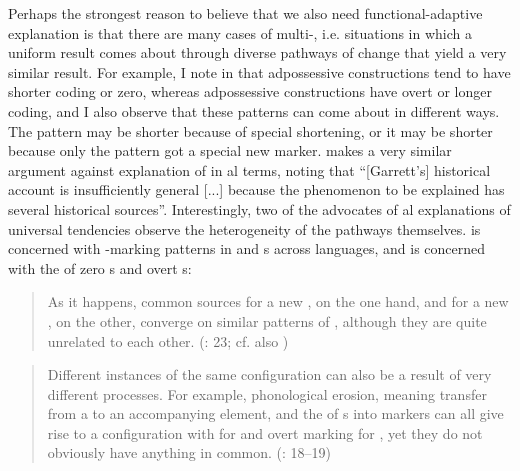 \documentclass[output=paper]{langsci/langscibook}
\begin{document}
Perhaps the strongest reason to believe that we also need functional-adaptive explanation is that there are many cases of multi-, i.e. situations in which a uniform result comes about through diverse pathways of change that yield a very similar result. For example, I note in \citet{Haspelmath2017} that  adpossessive constructions tend to have shorter coding or zero, whereas  adpossessive constructions have overt or longer coding, and I also observe that these patterns can come about in different ways. The  pattern may be shorter because of special shortening, or it may be shorter because only the  pattern got a special new marker. \citet[37]{Kiparsky2008} makes a very similar argument against  explanation of  in al terms, noting that “[Garrett’s] historical account is insufficiently general [...] because the phenomenon to be explained has several historical sources”.
\newpage
Interestingly, two of the advocates of al explanations of universal tendencies observe the heterogeneity of the pathways themselves. \citet{Anderson2016} is concerned with -marking patterns in  and  s across languages, and \citet{Cristofaro2017} is concerned with the  of zero s and overt s:

\begin{quote}
As it happens, common sources for a new , on the one hand, and for a new , on the other, converge on similar patterns of , although they are quite unrelated to each other. (\citealt{Anderson2016}: 23; cf. also \citealt{Anderson1977})
\end{quote}

\begin{quote}
Different instances of the same configuration can also be a result of very different processes. For example, phonological erosion, meaning transfer from a  to an accompanying element, and the  of s into  markers can all give rise to a configuration with  for  and overt marking for , yet they do not obviously have anything in common. (\citealt{Cristofaro2017}: 18–19)
\end{quote}
\end{document}

